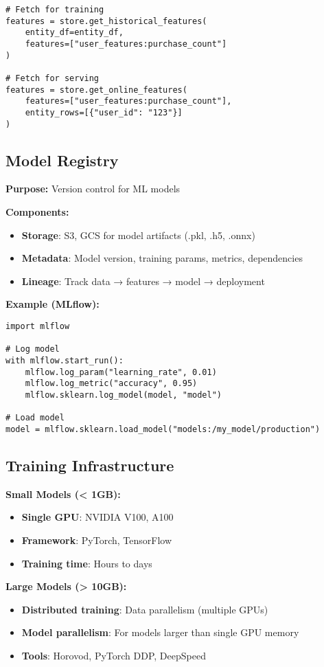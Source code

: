 \documentclass[8pt,landscape]{article}
\begin{document}
\begin{multicols}{3}
\begin{verbatim}
# Fetch for training
features = store.get_historical_features(
    entity_df=entity_df,
    features=["user_features:purchase_count"]
)

# Fetch for serving
features = store.get_online_features(
    features=["user_features:purchase_count"],
    entity_rows=[{"user_id": "123"}]
)
\end{verbatim}

\subsection*{Model Registry}
\textbf{Purpose:} Version control for ML models

\textbf{Components:}
\begin{itemize}
\item \textbf{Storage}: S3, GCS for model artifacts (.pkl, .h5, .onnx)
\item \textbf{Metadata}: Model version, training params, metrics, dependencies
\item \textbf{Lineage}: Track data → features → model → deployment
\end{itemize}

\textbf{Example (MLflow):}
\begin{verbatim}
import mlflow

# Log model
with mlflow.start_run():
    mlflow.log_param("learning_rate", 0.01)
    mlflow.log_metric("accuracy", 0.95)
    mlflow.sklearn.log_model(model, "model")

# Load model
model = mlflow.sklearn.load_model("models:/my_model/production")
\end{verbatim}

\subsection*{Training Infrastructure}

\textbf{Small Models (< 1GB):}
\begin{itemize}
\item \textbf{Single GPU}: NVIDIA V100, A100
\item \textbf{Framework}: PyTorch, TensorFlow
\item \textbf{Training time}: Hours to days
\end{itemize}

\textbf{Large Models (> 10GB):}
\begin{itemize}
\item \textbf{Distributed training}: Data parallelism (multiple GPUs)
\item \textbf{Model parallelism}: For models larger than single GPU memory
\item \textbf{Tools}: Horovod, PyTorch DDP, DeepSpeed
\end{itemize}


\end{multicols}
\end{document}
